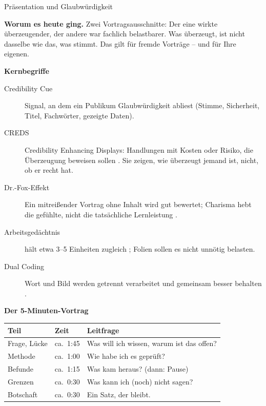 \begin{handout}{Präsentation und Glaubwürdigkeit}

\textbf{Worum es heute ging.} Zwei Vortragsausschnitte: Der eine wirkte
überzeugender, der andere war fachlich belastbarer. Was überzeugt, ist
nicht dasselbe wie das, was stimmt. Das gilt für fremde Vorträge -- und
für Ihre eigenen.

\textbf{Kernbegriffe}
\begin{description}
  \item[Credibility Cue] Signal, an dem ein Publikum Glaubwürdigkeit
    abliest (Stimme, Sicherheit, Titel, Fachwörter, gezeigte Daten).
  \item[CREDS] Credibility Enhancing Displays: Handlungen mit Kosten oder
    Risiko, die Überzeugung beweisen sollen \parencite{henrich2009}. Sie
    zeigen, wie überzeugt jemand ist, nicht, ob er recht hat.
  \item[Dr.-Fox-Effekt] Ein mitreißender Vortrag ohne Inhalt wird gut
    bewertet; Charisma hebt die gefühlte, nicht die tatsächliche
    Lernleistung \parencite{naftulin1973drfox,peerbabad2014drfox}.
  \item[Arbeitsgedächtnis] hält etwa 3--5 Einheiten zugleich
    \parencite{cowan2001magical}; Folien sollen es nicht unnötig belasten.
  \item[Dual Coding] Wort und Bild werden getrennt verarbeitet und
    gemeinsam besser behalten \parencite{paivio1986mental}.
\end{description}

\textbf{Der 5-Minuten-Vortrag}

\begin{center}\small
\begin{tabular}{p{}p{}p{}}
\toprule
\textbf{Teil} & \textbf{Zeit} & \textbf{Leitfrage} \\
\midrule
Frage, Lücke & ca.\ 1:45 & Was will ich wissen, warum ist das offen? \\
Methode & ca.\ 1:00 & Wie habe ich es geprüft? \\
Befunde & ca.\ 1:15 & Was kam heraus? (dann: Pause) \\
Grenzen & ca.\ 0:30 & Was kann ich (noch) nicht sagen? \\
Botschaft & ca.\ 0:30 & Ein Satz, der bleibt. \\
\bottomrule
\end{tabular}
\end{center}


\end{handout}
